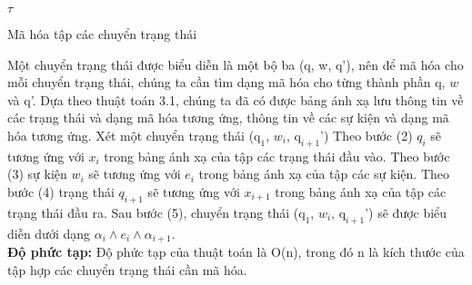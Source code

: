 \documentclass[a4paper,13pt,oneside,openany]{book}
\newenvironment{megaalgorithm}[1][htb]
{\renewcommand{\algorithmcfname}{Thuật toán}%
	\begin{algorithm}[#1]%
}{\end{algorithm}}
\begin{document}
\begin{flushleft}
\begin{megaalgorithm}[H]
			\Return $\tau$
				
			\caption{Mã hóa tập các chuyển trạng thái}
		\end{megaalgorithm}
		
		Một chuyển trạng thái được biểu diễn là một bộ ba (q, w, q'), nên để mã hóa cho mỗi chuyển trạng thái, chúng ta cần tìm dạng mã hóa cho từng thành phần q, $w$ và q'. Dựa theo thuật toán 3.1, chúng ta đã có được bảng ánh xạ lưu thông tin về các trạng thái và dạng mã hóa tương ứng, thông tin về các sự kiện và dạng mã hóa tương ứng. Xét một chuyển trạng thái ($\textrm{q}_1$, $w_i$, $\textrm{q}_{i+1}$') Theo bước (2) $q_{i}$ sẽ tương ứng với $x_i$ trong bảng ánh xạ của tập các trạng thái đầu vào. Theo bước (3) sự kiện $w_i$ sẽ tương ứng với $e_i$ trong bảng ánh xạ của tập các sự kiện. Theo bước (4) trạng thái $q_{i+1}$ sẽ tương ứng với $x_{i+1}$ trong bảng ánh xạ của tập các trạng thái đầu ra. Sau bước (5), chuyển trạng thái ($\textrm{q}_1$, $w_i$, $\textrm{q}_{i+1}$') sẽ được biểu diễn dưới dạng $\alpha_{i} \land e_i \land \alpha_{i+1}$.\\
		\textbf{Độ phức tạp:} Độ phức tạp của thuật toán là O(n), trong đó n là kích thước của tập hợp các chuyển trạng thái cần mã hóa.

\end{flushleft}
\end{document}
